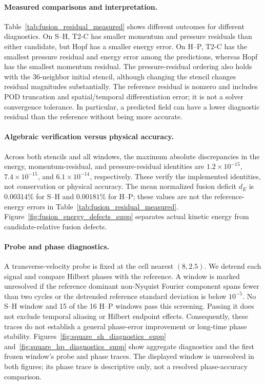 \paragraph{Measured comparisons and interpretation.}
Table~\ref{tab:fusion_residual_measured} shows different outcomes for
different diagnostics. On S--H, T2-C has smaller momentum and pressure
residuals than either candidate, but Hopf has a smaller energy error.
On H--P, T2-C has the smallest pressure residual and energy error among
the predictions, whereas Hopf has the smallest momentum residual.
The pressure-residual ordering also holds with the 36-neighbor initial
stencil, although changing the stencil changes residual magnitudes
substantially. The reference residual is nonzero and includes POD
truncation and spatial/temporal differentiation error; it is not a solver
convergence tolerance. In particular, a predicted field can have a lower
diagnostic residual than the reference without being more accurate.

\paragraph{Algebraic verification versus physical accuracy.}
Across both stencils and all windows, the maximum absolute discrepancies
in the energy, momentum-residual, and pressure-residual identities are
$1.2\times10^{-15}$, $7.4\times10^{-15}$, and $6.1\times10^{-14}$,
respectively. These verify the implemented identities, not conservation
or physical accuracy. The mean normalized fusion deficit $d_E$ is
$0.00314\%$ for S--H and $0.00181\%$ for H--P; these values are not
the reference-energy errors in Table~\ref{tab:fusion_residual_measured}.
Figure~\ref{fig:fusion_energy_defects_supp} separates actual kinetic
energy from candidate-relative fusion defects.

\paragraph{Probe and phase diagnostics.}
A transverse-velocity probe is fixed at the cell nearest $(8,2.5)$.
We detrend each signal and compare Hilbert phases with the reference.
A window is marked unresolved if the reference dominant non-Nyquist
Fourier component spans fewer than two cycles or the detrended reference
standard deviation is below $10^{-5}$. No S--H window and 15 of the 16
H--P windows pass this screening. Passing it does not exclude temporal
aliasing or Hilbert endpoint effects. Consequently, these traces do not
establish a general phase-error improvement or long-time phase stability.
Figures~\ref{fig:square_sh_diagnostics_supp}
and~\ref{fig:square_hp_diagnostics_supp} show aggregate diagnostics and
the first frozen window's probe and phase traces. The displayed window
is unresolved in both figures; its phase trace is descriptive only,
not a resolved phase-accuracy comparison.

